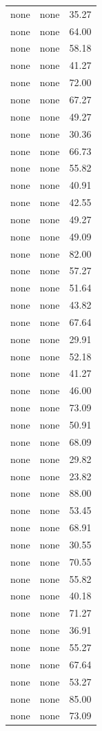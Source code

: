 \begin{tabular}{rrr}
none & none & 35.27 \\
none & none & 64.00 \\
none & none & 58.18 \\
none & none & 41.27 \\
none & none & 72.00 \\
none & none & 67.27 \\
none & none & 49.27 \\
none & none & 30.36 \\
none & none & 66.73 \\
none & none & 55.82 \\
none & none & 40.91 \\
none & none & 42.55 \\
none & none & 49.27 \\
none & none & 49.09 \\
none & none & 82.00 \\
none & none & 57.27 \\
none & none & 51.64 \\
none & none & 43.82 \\
none & none & 67.64 \\
none & none & 29.91 \\
none & none & 52.18 \\
none & none & 41.27 \\
none & none & 46.00 \\
none & none & 73.09 \\
none & none & 50.91 \\
none & none & 68.09 \\
none & none & 29.82 \\
none & none & 23.82 \\
none & none & 88.00 \\
none & none & 53.45 \\
none & none & 68.91 \\
none & none & 30.55 \\
none & none & 70.55 \\
none & none & 55.82 \\
none & none & 40.18 \\
none & none & 71.27 \\
none & none & 36.91 \\
none & none & 55.27 \\
none & none & 67.64 \\
none & none & 53.27 \\
none & none & 85.00 \\
none & none & 73.09 \\

\end{tabular}
